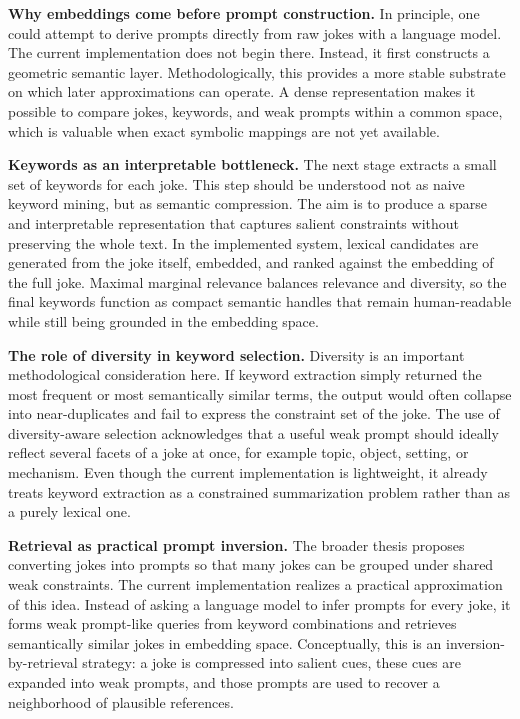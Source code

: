 \documentclass[11pt]{article}
\begin{document}
\textbf{Why embeddings come before prompt construction.} In principle, one could attempt to derive prompts directly from raw jokes with a language model. The current implementation does not begin there. Instead, it first constructs a geometric semantic layer. Methodologically, this provides a more stable substrate on which later approximations can operate. A dense representation makes it possible to compare jokes, keywords, and weak prompts within a common space, which is valuable when exact symbolic mappings are not yet available.

\textbf{Keywords as an interpretable bottleneck.} The next stage extracts a small set of keywords for each joke. This step should be understood not as naive keyword mining, but as semantic compression. The aim is to produce a sparse and interpretable representation that captures salient constraints without preserving the whole text. In the implemented system, lexical candidates are generated from the joke itself, embedded, and ranked against the embedding of the full joke. Maximal marginal relevance balances relevance and diversity, so the final keywords function as compact semantic handles that remain human-readable while still being grounded in the embedding space.

\textbf{The role of diversity in keyword selection.} Diversity is an important methodological consideration here. If keyword extraction simply returned the most frequent or most semantically similar terms, the output would often collapse into near-duplicates and fail to express the constraint set of the joke. The use of diversity-aware selection acknowledges that a useful weak prompt should ideally reflect several facets of a joke at once, for example topic, object, setting, or mechanism. Even though the current implementation is lightweight, it already treats keyword extraction as a constrained summarization problem rather than as a purely lexical one.

\textbf{Retrieval as practical prompt inversion.} The broader thesis proposes converting jokes into prompts so that many jokes can be grouped under shared weak constraints. The current implementation realizes a practical approximation of this idea. Instead of asking a language model to infer prompts for every joke, it forms weak prompt-like queries from keyword combinations and retrieves semantically similar jokes in embedding space. Conceptually, this is an inversion-by-retrieval strategy: a joke is compressed into salient cues, these cues are expanded into weak prompts, and those prompts are used to recover a neighborhood of plausible references.
\end{document}
